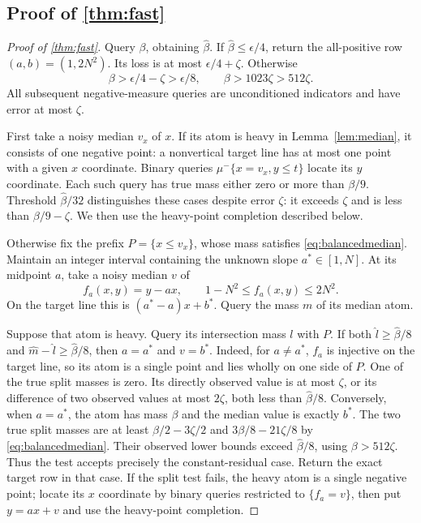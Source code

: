 \subsection[Proof of result fast]{Proof of \cref{thm:fast}}\label{proof:fast}
\begin{proof}[Proof of \cref{thm:fast}]
Query $\beta$, obtaining $\widehat\beta$. If $\widehat\beta\le\epsilon/4$, return the all-positive row $(a,b)=(1,2N^2)$. Its loss is at most $\epsilon/4+\zeta$. Otherwise
\[
 \beta>\epsilon/4-\zeta>\epsilon/8,
 \qquad \beta>1023\zeta>512\zeta.
\]
All subsequent negative-measure queries are unconditioned indicators and have error at most $\zeta$.

First take a noisy median $v_x$ of $x$. If its atom is heavy in Lemma~\ref{lem:median}, it consists of one negative point: a nonvertical target line has at most one point with a given $x$ coordinate. Binary queries $\mu^-\{x=v_x,y\le t\}$ locate its $y$ coordinate. Each such query has true mass either zero or more than $\beta/9$. Threshold $\widehat\beta/32$ distinguishes these cases despite error $\zeta$: it exceeds $\zeta$ and is less than $\beta/9-\zeta$. We then use the heavy-point completion described below.

Otherwise fix the prefix $P=\{x\le v_x\}$, whose mass satisfies \eqref{eq:balancedmedian}. Maintain an integer interval containing the unknown slope $a^*\in[1,N]$. At its midpoint $a$, take a noisy median $v$ of
\[
 f_a(x,y)=y-ax,
 \qquad 1-N^2\le f_a(x,y)\le2N^2.
\]
On the target line this is $(a^*-a)x+b^*$. Query the mass $m$ of its median atom.

Suppose that atom is heavy. Query its intersection mass $l$ with $P$. If both $\widehat l\ge\widehat\beta/8$ and $\widehat m-\widehat l\ge\widehat\beta/8$, then $a=a^*$ and $v=b^*$. Indeed, for $a\ne a^*$, $f_a$ is injective on the target line, so its atom is a single point and lies wholly on one side of $P$. One of the true split masses is zero. Its directly observed value is at most $\zeta$, or its difference of two observed values at most $2\zeta$, both less than $\widehat\beta/8$. Conversely, when $a=a^*$, the atom has mass $\beta$ and the median value is exactly $b^*$. The two true split masses are at least $\beta/2-3\zeta/2$ and $3\beta/8-21\zeta/8$ by \eqref{eq:balancedmedian}. Their observed lower bounds exceed $\widehat\beta/8$, using $\beta>512\zeta$. Thus the test accepts precisely the constant-residual case. Return the exact target row in that case. If the split test fails, the heavy atom is a single negative point; locate its $x$ coordinate by binary queries restricted to $\{f_a=v\}$, then put $y=ax+v$ and use the heavy-point completion.


\end{proof}

